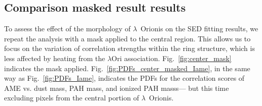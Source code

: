     \subsection{Comparison masked result results}
        To assess the effect of the morphology of $\lambda$~Orionis on the SED fitting results, we repeat the analysis with a mask applied to the central region. This allows us to focus on the variation of correlation strengths within the ring structure, which is less affected by heating from the $\lambda$Ori association. Fig.~\ref{fig:center_mask} indicates the mask applied. Fig.~\ref{fig:PDFs_center_masked_Iame}, in the same way as Fig.~\ref{fig:PDFs_Iame}, indicates the PDFs for the correlation scores of AME vs. dust mass, PAH mass, and ionized PAH masss--- but this time excluding pixels from the central portion of $\lambda$~Orionis.

